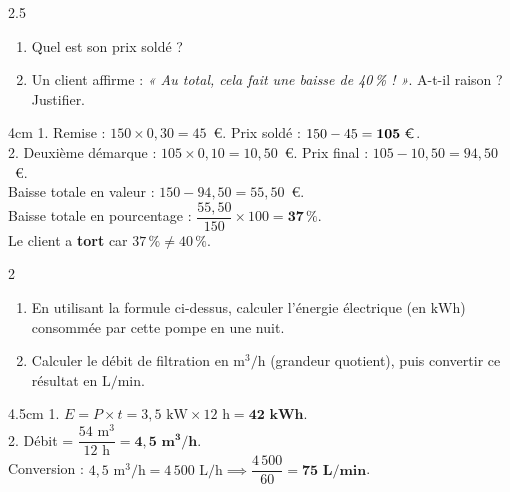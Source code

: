 \documentclass[a4paper]{book}
\begin{document}
{    
    \begin{exerciceNote}{2.5}
        \begin{enumerate}
            \item Quel est son prix soldé ?
            \item Un client affirme : \textit{« Au total, cela fait une baisse de 40\,\% ! »}. A-t-il raison ? Justifier.
        \end{enumerate}
        \begin{ZoneReponse}{4cm}
        1. Remise : $150 \times 0,30 = 45$~\euro. Prix soldé : $150 - 45 = \mathbf{105\text{ \euro}}$. \\
        2. Deuxième démarque : $105 \times 0,10 = 10,50$~\euro. Prix final : $105 - 10,50 = 94,50$~\euro. \\
        \phantom{2. }Baisse totale en valeur : $150 - 94,50 = 55,50$~\euro. \\
        \phantom{2. }Baisse totale en pourcentage : $\dfrac{55,50}{150} \times 100 = \mathbf{37\,\%}$. \\
        \phantom{2. }Le client a \textbf{tort} car $37\,\% \neq 40\,\%$.
        \end{ZoneReponse}
    \end{exerciceNote}
    
        
    \begin{exerciceNote}{2}
        \begin{enumerate}
            \item En utilisant la formule ci-dessus, calculer l'énergie électrique (en $\text{kWh}$) consommée par cette pompe en une nuit.
            \item Calculer le débit de filtration en $\text{m}^3/\text{h}$ (grandeur quotient), puis convertir ce résultat en $\text{L/min}$.
        \end{enumerate}
        \begin{ZoneReponse}{4.5cm}
        1. $E = P \times t = 3,5\text{ kW} \times 12\text{ h} = \mathbf{42\text{ kWh}}$. \\
        2. Débit = $\dfrac{54\text{ m}^3}{12\text{ h}} = \mathbf{4,5\text{ m}^3/\text{h}}$. \\
        \phantom{2. }Conversion : $4,5\text{ m}^3/\text{h} = 4\,500\text{ L/h} \implies \dfrac{4\,500}{60} = \mathbf{75\text{ L/min}}$.
        \end{ZoneReponse}
    \end{exerciceNote}
    
    
\newpage

}
\end{document}
